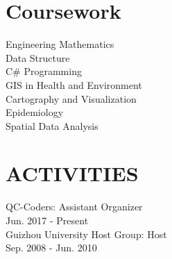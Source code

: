 \documentclass[]{deedy-resume-openfont}
\begin{document}
\begin{minipage}[t]{0.3\textwidth}

\section{Coursework}
Engineering Mathematics \\
Data Structure \\
C\# Programming\\
GIS in Health and Environment \\
Cartography and Visualization\\
Epidemiology \\
Spatial Data Analysis\\
\sectionsep



\section{ACTIVITIES} 
QC-Coders: Assistant Organizer\\
Jun. 2017 - Present\\
Guizhou University Host Group: Host\\
Sep. 2008 - Jun. 2010




\end{minipage}
\end{document}
